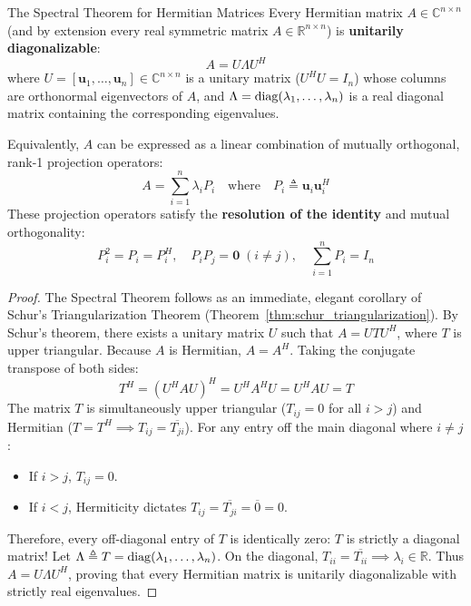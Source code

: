 \begin{theorembox}{The Spectral Theorem for Hermitian Matrices}
Every Hermitian matrix $A \in \mathbb{C}^{n \times n}$ (and by extension every real symmetric matrix $A \in \mathbb{R}^{n \times n}$) is \textbf{unitarily diagonalizable}:
\begin{equation}
A = U \Lambda U^H
\label{eq:spectral_theorem_matrix}
\end{equation}
where $U = [\mathbf{u}_1, \dots, \mathbf{u}_n] \in \mathbb{C}^{n \times n}$ is a unitary matrix ($U^H U = I_n$) whose columns are orthonormal eigenvectors of $A$, and $\Lambda = \operatorname{diag}(\lambda_1, \dots, \lambda_n)$ is a real diagonal matrix containing the corresponding eigenvalues.

Equivalently, $A$ can be expressed as a linear combination of mutually orthogonal, rank-1 projection operators:
\begin{equation}
A = \sum_{i=1}^n \lambda_i P_i \quad \text{where} \quad P_i \triangleq \mathbf{u}_i \mathbf{u}_i^H
\label{eq:spectral_theorem_projectors}
\end{equation}
These projection operators satisfy the \textbf{resolution of the identity} and mutual orthogonality:
\begin{equation}
P_i^2 = P_i = P_i^H, \quad P_i P_j = \mathbf{0} \; (i \ne j), \quad \sum_{i=1}^n P_i = I_n
\label{eq:projector_properties}
\end{equation}
\end{theorembox}

\begin{proof}
The Spectral Theorem follows as an immediate, elegant corollary of Schur's Triangularization Theorem (Theorem~\ref{thm:schur_triangularization}).
By Schur's theorem, there exists a unitary matrix $U$ such that $A = U T U^H$, where $T$ is upper triangular.
Because $A$ is Hermitian, $A = A^H$. Taking the conjugate transpose of both sides:
\begin{equation}
T^H = (U^H A U)^H = U^H A^H U = U^H A U = T
\end{equation}
The matrix $T$ is simultaneously upper triangular ($T_{ij} = 0$ for all $i > j$) and Hermitian ($T = T^H \implies T_{ij} = \overline{T_{ji}}$).
For any entry off the main diagonal where $i \ne j$:
\begin{itemize}
    \item If $i > j$, $T_{ij} = 0$.
    \item If $i < j$, Hermiticity dictates $T_{ij} = \overline{T_{ji}} = \overline{0} = 0$.
\end{itemize}
Therefore, every off-diagonal entry of $T$ is identically zero: $T$ is strictly a diagonal matrix!
Let $\Lambda \triangleq T = \operatorname{diag}(\lambda_1, \dots, \lambda_n)$.
On the diagonal, $T_{ii} = \overline{T_{ii}} \implies \lambda_i \in \mathbb{R}$.
Thus $A = U \Lambda U^H$, proving that every Hermitian matrix is unitarily diagonalizable with strictly real eigenvalues.
\end{proof}

